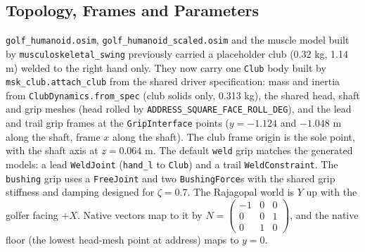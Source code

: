 \documentclass[11pt,a4paper]{article}
\begin{document}
\subsection{Topology, Frames and Parameters}
\texttt{golf\_humanoid.osim}, \texttt{golf\_humanoid\_scaled.osim} and the
muscle model built by \texttt{musculoskeletal\_swing} previously carried a
placeholder club (0.32 kg, 1.14 m) welded to the right hand only. They now
carry one \texttt{Club} body built by \texttt{msk\_club.attach\_club} from
the shared driver specification: mass and inertia from
\texttt{ClubDynamics.from\_spec} (club solids only, 0.313 kg), the shared
head, shaft and grip meshes (head rolled by
\texttt{ADDRESS\_SQUARE\_FACE\_ROLL\_DEG}), and the lead and trail grip frames
at the \texttt{GripInterface} points ($y=-1.124$ and $-1.048$ m along the
shaft, frame $x$ along the shaft). The club frame origin is the sole point,
with the shaft axis at $z=0.064$ m. The default \texttt{weld} grip matches
the generated models: a lead \texttt{WeldJoint} (\texttt{hand\_l} to
\texttt{Club}) and a trail \texttt{WeldConstraint}. The \texttt{bushing}
grip uses a \texttt{FreeJoint} and two \texttt{BushingForce}s with the shared
grip stiffness and damping designed for $\zeta=0.7$. The Rajagopal world is
$Y$ up with the golfer facing $+X$. Native vectors map to it by
$N=\left(\begin{smallmatrix}-1&0&0\\0&0&1\\0&1&0\end{smallmatrix}\right)$, and the native
floor (the lowest head-mesh point at address) maps to $y=0$.
\end{document}
